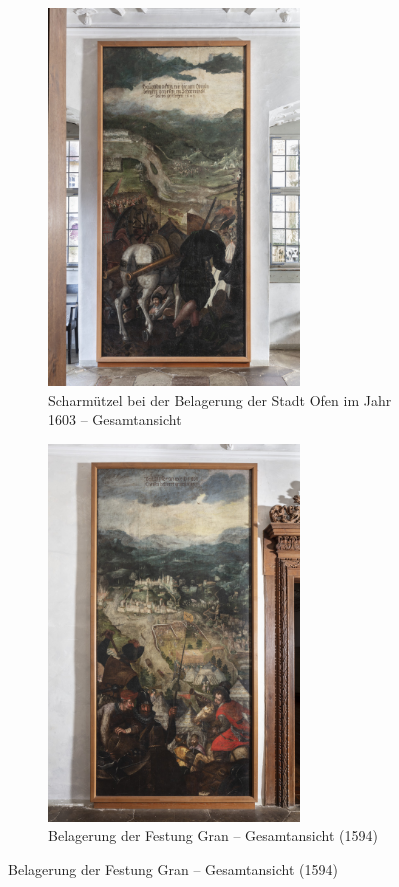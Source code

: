 \documentclass[
  a4paper,
]{book}
\begin{document}
\begin{figure}
\begin{figure}[H]    
  \includegraphics[height=10cm]{images/fmd10005849a.jpg}
  \caption{Scharmützel bei der Belagerung der Stadt Ofen im Jahr 1603 – Gesamtansicht}
  \label{fig:{images/fmd10005849a.jpg}}
\end{figure}

\clearpage

\begin{figure}[H]    
  \includegraphics[height=10cm]{images/fmd10005841a.jpg}
  \caption{Belagerung der Festung Gran – Gesamtansicht (1594)}
  \label{fig:{images/fmd10005841a.jpg}}
\end{figure}

\clearpage


\end{figure}
\end{document}
